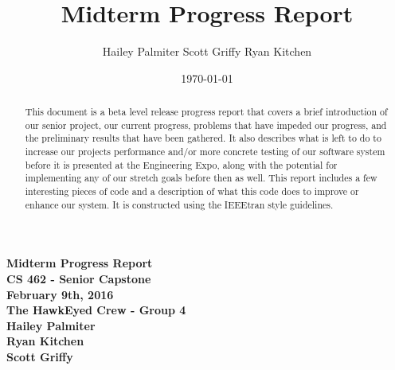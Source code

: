 \documentclass[letterpaper,10pt,titlepage]{IEEEtran}
\title{Midterm Progress Report}
\author{Hailey Palmiter Scott Griffy Ryan Kitchen}
\date{\today}
\begin{document}
   \begin{titlepage}
      \centering
      \vfill
      {\bfseries\Large
         Midterm Progress Report \\
         CS 462 - Senior Capstone\\
         \vskip2cm
         February 9th, 2016\\
         \vskip2cm
         The HawkEyed Crew - Group 4\\ 
         \vskip1cm
         Hailey Palmiter\\
         \vskip1cm
         Ryan Kitchen\\
         \vskip1cm
         Scott Griffy\\
    
      }
      \vfill
      \vskip2cm
      \begin{abstract}
      This document is a beta level release progress report that covers a brief introduction of our senior project, our current progress, problems that have impeded our progress, and the preliminary results that have been gathered. It also describes what is left to do to increase our projects performance and/or more concrete testing of our software system before it is presented at the Engineering Expo, along with the potential for implementing any of our stretch goals before then as well. This report includes a few interesting pieces of code and a description of what this code does to improve or enhance our system. It is constructed using the IEEEtran style guidelines.
      \end{abstract}
      \vfill
   \end{titlepage}
   
   \onecolumn
   \tableofcontents
   \newpage
   \bigskip
\end{document}
